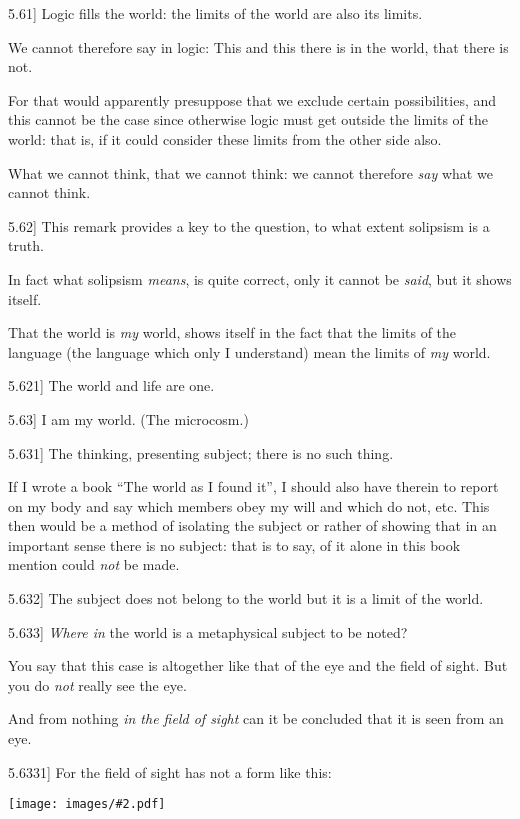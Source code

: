 \documentclass[12pt,oneside]{book}[2007/10/19]
\newcommand{\PropositionE}[2]{%
  \item[\phantomsection\label{PropE:#1}\PropGRef{#1}] #2%
}
\newcommand{\PropGRef}[1]{\hyperref[PropG:#1]{#1}}
\newcommand{\Illustration}[2][0.3\textwidth]{%
  \begin{center}
  \texttt{[image: images/\#2.pdf]}
  \end{center}
}
\begin{document}
\begin{propositions}
\PropositionE{5.61}
{Logic fills the world: the limits of the world
are also its limits.

We cannot therefore say in logic: This and
this there is in the world, that there is not.

For that would apparently presuppose that we
exclude certain possibilities, and this cannot be
the case since otherwise logic must get outside
the limits of the world: that is, if it could
consider these limits from the other side
also.

What we cannot think, that we cannot think:
we cannot therefore \emph{say} what we cannot
think.}


\PropositionE{5.62}
{This remark provides a key to the question, to
what extent solipsism is a truth.

In fact what solipsism \emph{means}, is quite correct,
only it cannot be \emph{said}, but it shows itself.

That the world is \emph{my} world, shows itself in the
fact that the limits of the language (the language
which only I understand) mean the limits of \emph{my}
world.}


\PropositionE{5.621}
{The world and life are one.}


\PropositionE{5.63}
{I am my world. (The microcosm.)}


\PropositionE{5.631}
{The thinking, presenting subject; there is no
such thing.

If I wrote a book ``The world as I found it'',
I should also have therein to report on my body
and say which members obey my will and which
do not, etc. This then would be a method of
isolating the subject or rather of showing that in
an important sense there is no subject: that is to
say, of it alone in this book mention could \emph{not} be
made.}


\PropositionE{5.632}
{The subject does not belong to the world but
it is a limit of the world.}


\PropositionE{5.633}
{\emph{Where in} the world is a metaphysical subject to
be noted?

You say that this case is altogether like that of
the eye and the field of sight. But you do \emph{not}
really see the eye.

And from nothing \emph{in the field of sight} can it be
concluded that it is seen from an eye.}


\PropositionE{5.6331}
{For the field of sight has not a form like this:
\Illustration{sight-en}
}



\end{propositions}
\end{document}
